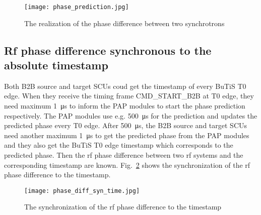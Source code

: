 \begin{figure}[!htb]
   \centering   
   \texttt{[image: phase\_prediction.jpg]}
   \caption{The realization of the phase difference between two synchrotrons}
   \label{phase_prediction}
\end{figure}

\subsection{Rf phase difference synchronous to the absolute timestamp}
Both B2B source and target SCUs coud get the timestamp of every BuTiS T0 edge. When they receive the timing frame CMD\_START\_B2B at T0 edge, they need maximum \SI{1}{\us} to inform the PAP modules to start the phase prediction respectively. The PAP modules use e.g. \SI{500}{\us} for the prediction and updates the predicted phase every T0 edge. After \SI{500}{\us}, the B2B source and target SCUs need another maximum \SI{1}{\us} to get the predicted phase from the PAP modules and they also get the BuTiS T0 edge timestamp which corresponds to the predicted phase. Then the rf phase difference between two rf systems and the corresponding timestamp are known. Fig.~\ref{phase_diff_syn_time} shows the synchronization of the rf phase difference to the timestamp.
 \begin{figure}[!htb]
   \centering   
   \texttt{[image: phase\_diff\_syn\_time.jpg]}
   \caption{The synchronization of the rf phase difference to the timestamp}
   \label{phase_diff_syn_time}
\end{figure}
